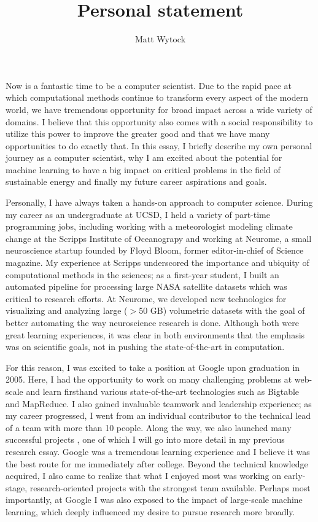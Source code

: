 \documentclass[12pt]{article}
\title{Personal statement}
\author{Matt Wytock}
\begin{document}
Now is a fantastic time to be a computer scientist. Due to the rapid pace at which computational methods continue to transform every aspect of the modern world, we have tremendous opportunity for broad impact across a wide variety of domains. I believe that this opportunity also comes with a social responsibility to utilize this power to improve the greater good and that we have many opportunities to do exactly that. In this essay, I briefly describe my own personal journey as a computer scientist, why I am excited about the potential for machine learning to have a big impact on critical problems in the field of sustainable energy and finally my future career aspirations and goals.

Personally, I have always taken a hands-on approach to computer science. During my career as an undergraduate at UCSD, I held a variety of part-time programming jobs, including working with a meteorologist modeling climate change at the Scripps Institute of Oceanograpy and working at Neurome, a small neuroscience startup founded by Floyd Bloom, former editor-in-chief of Science magazine. My experience at Scripps underscored the importance and ubiquity of computational methods in the sciences; as a first-year student, I built an automated pipeline for processing large NASA satellite datasets which was critical to research efforts. At Neurome, we developed new technologies for visualizing and analyzing large ($>$50 GB) volumetric datasets with the goal of better automating the way neuroscience research is done. Although both were great learning experiences, it was clear in both environments that the emphasis was on scientific goals, not in pushing the state-of-the-art in computation.

For this reason, I was excited to take a position at Google upon graduation in 2005. Here, I had the opportunity to work on many challenging problems at web-scale and learn firsthand various state-of-the-art technologies such as Bigtable and MapReduce. I also gained invaluable teamwork and leadership experience; as my career progressed, I went from an individual contributor to the technical lead of a team with more than 10 people. Along the way, we also launched many successful projects \cite{claiborne,gultekin,mayer,seth}, one of which I will go into more detail in my previous research essay. Google was a tremendous learning experience and I believe it was the best route for me immediately after college. Beyond the technical knowledge acquired, I also came to realize that what I enjoyed most was working on early-stage, research-oriented projects with the strongest team available. Perhaps most importantly, at Google I was also exposed to the impact of large-scale machine learning, which deeply influenced my desire to pursue research more broadly. 
\end{document}

